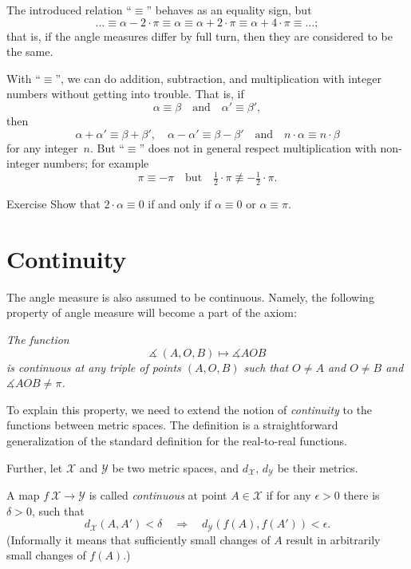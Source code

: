 The introduced relation ``$\equiv$'' behaves as an equality sign,
but
\[\dots\equiv\alpha-2\cdot\pi\equiv \alpha\equiv \alpha+2\cdot\pi\equiv \alpha+4\cdot\pi\equiv\dots;\] 
that is, if the angle measures differ by full turn,
then they are considered to be the same.

With ``$\equiv$'', we can do addition, subtraction, and multiplication with integer numbers without getting into trouble.
That is, if
$$\alpha\equiv\beta
\quad
\text{and}
\quad
\alpha'\equiv \beta',$$ 
then
$$\alpha+\alpha'\equiv\beta+\beta',
\quad
\alpha-\alpha'\equiv \beta-\beta'
\quad 
\text{and}
\quad
n\cdot\alpha\equiv n\cdot\beta$$
for any integer~$n$.
But ``$\equiv$'' does not in general respect multiplication with non-integer numbers; for example 
$$\pi
\equiv 
-\pi
\quad
\text{but}
\quad
\tfrac12\cdot\pi
\not\equiv
-\tfrac12\cdot\pi.$$ 

\begin{thm}{Exercise}\label{ex:2a=0}
Show that $2\cdot\alpha\equiv0$ if and only if $\alpha\equiv0$ or $\alpha\equiv\pi$.
\end{thm}

\section*{Continuity}

The angle measure is also assumed to be continuous.
Namely, the following property of angle measure will become a part of the axiom:

\textit{The function}
$$\measuredangle\:(A,O,B)\mapsto\measuredangle A O B$$
\textit{is continuous at any triple of points $(A,O,B)$
such that $O\ne A$ and $O\ne B$ and $\measuredangle A O B\ne\pi$.}

To explain this property, we need to extend the notion of {}\emph{continuity} to the functions between metric spaces.
The definition is a straightforward generalization of the standard definition for the real-to-real functions.

Further, let $\mathcal X$ and $\mathcal Y$ be two metric spaces,
and $d_{\mathcal X}$, $d_{\mathcal Y}$ be their metrics.

A map $f\:\mathcal X\to\mathcal Y$ is called \emph{continuous} at point $A\in \mathcal X$
if for any $\epsilon>0$ there is $\delta>0$, such that 
\[d_{\mathcal X}(A,A')
<
\delta
\quad
\Rightarrow
\quad
d_{\mathcal Y}(f(A),f(A'))
<
\epsilon.\]
(Informally it means that sufficiently small changes of $A$ result in arbitrarily small changes of $f(A)$.)

